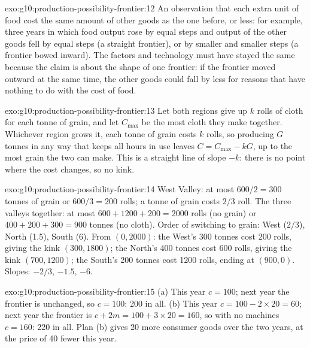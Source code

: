 \begin{solution}{exo:g10:production-possibility-frontier:12}
An observation that each extra unit of food cost the same amount of other goods as the one before, or
less: for example, three years in which food output rose by equal steps and output of the other goods
fell by equal steps (a straight frontier), or by smaller and smaller steps (a frontier bowed inward). The
factors and technology must have stayed the same because the claim is about the shape of one frontier: if
the frontier moved outward at the same time, the other goods could fall by less for reasons that have
nothing to do with the cost of food.
\end{solution}

\begin{solution}{exo:g10:production-possibility-frontier:13}
Let both regions give up $k$ rolls of cloth for each tonne of grain, and let $C_{\max}$ be the most cloth
they make together. Whichever region grows it, each tonne of grain costs $k$ rolls, so producing $G$ tonnes
in any way that keeps all hours in use leaves $C = C_{\max} - kG$, up to the most grain the two can make.
This is a straight line of slope $-k$: there is no point where the cost changes, so no kink.
\end{solution}

\begin{solution}{exo:g10:production-possibility-frontier:14}
West Valley: at most $600/2 = 300$ tonnes of grain or $600/3 = 200$ rolls; a tonne of grain costs $2/3$
roll. The three valleys together: at most $600 + 1200 + 200 = 2000$ rolls (no grain) or $400 + 200 + 300
= 900$ tonnes (no cloth). Order of switching to grain: West ($2/3$), North (1.5), South (6). From
$(0, 2000)$: the West's 300 tonnes cost 200 rolls, giving the kink $(300, 1800)$; the North's 400 tonnes
cost 600 rolls, giving the kink $(700, 1200)$; the South's 200 tonnes cost \num{1200} rolls, ending at
$(900, 0)$. Slopes: $-2/3$, $-1.5$, $-6$.
\end{solution}

\begin{solution}{exo:g10:production-possibility-frontier:15}
(a) This year $c = 100$; next year the frontier is unchanged, so $c = 100$: 200 in all. (b) This year $c =
100 - 2 \times 20 = 60$; next year the frontier is $c + 2m = 100 + 3 \times 20 = 160$, so with no machines
$c = 160$: 220 in all. Plan (b) gives 20 more consumer goods over the two years, at the price of 40 fewer
this year.
\end{solution}

